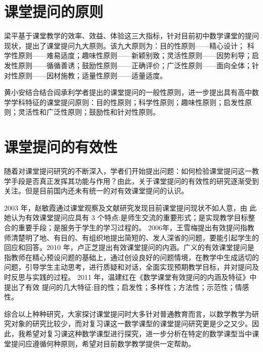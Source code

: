 \section{课堂提问的原则}

梁平基于课堂教学的效率、效益、体验这三大指标，针对目前初中数学课堂的提问现状，提出了课堂提问九大原则。该九大原则为：目的性原则——精心设计； 科学性原则——难易适度；趣味性原则——新颖别致；灵活性原则——因势利导；启发性原则——循循善诱；鼓励性原则——正确评价；广泛性原则——面向全体；针对性原则——因材施教；适量性原则——适量适度\cite{梁平2011初中数学课堂提问有效性及其策略的研究}。

黄小安结合结合阎承利学者提出的课堂提问的一般性原则，进一步提出具有高中数学学科特征的课堂提问原则：目的性原则；科学性原则；趣味性原则；启发性原则；灵活性和广泛性原则；鼓励性和针对性原则\cite{黄小安2006高中数学课堂提问有效性研究}。



\section{课堂提问的有效性}

随着对课堂提问研究的不断深入，学者们开始提出问题：如何检验课堂提问这一教学手段是否真正发挥其功能与作用？由此，关于课堂提问的有效性的研究逐渐受到关注。但是目前国内还未有统一的对有效课堂提问的认识。

2003 年，赵敏霞通过课堂观察及文献研究发现目前课堂提问现状不如人意，由 此她认为有效课堂提问应具有 3 个特点:是师生交流的重要形式；是实现教学目标整合的重要手段；是服务于学生的学习过程的\cite{赵敏霞2003对教师有效课堂教学提问的思考}。
2006年，王雪梅提出有效提问指教师清楚明了地、有目的、有组织地提出简短的、发人深省的问题，要能引起学生的回应和回答\cite{王雪梅2006课堂提问的有效性及其策略研究}。2010 年，卢正芝提出有效课堂提问的内涵。广义的有效课堂提问是指教师在精心预设问题的基础上，通过创设良好的问题情境，在教学中生成适切的问题，引导学生主动思考，进行质疑和对话，全面实现预期教学目标，并对提问及时反思与实践的过程\cite{卢正芝2010价值取向与标准建构}。
2011 年，温建红在《数学课堂有效提问的内涵及特征》中提出了有效 提问的几大特征:目的性；启发性；多样性；方法性；示范性；情感性\cite{温建红2011数学课堂有效提问的内涵及特征}。

综合以上种种研究，大家探讨课堂提问时大多针对普通教育而言，以数学教学为研究对象的研究比较少，而对复习课这一数学课型的课堂提问研究更是少之又少。因此，我希望对复习课这种数学课型进行探究，进一步分析在特定的数学课型当中课堂提问应遵循何种原则，希望对目前数学教学提供一定帮助。
